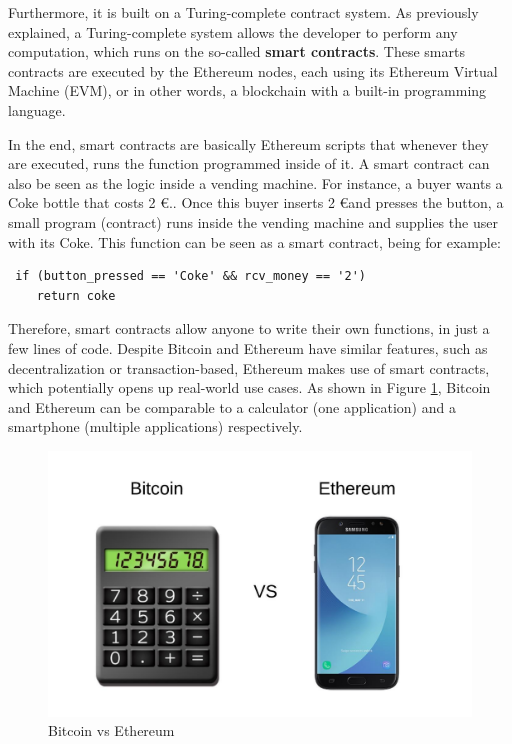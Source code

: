 Furthermore, it is built on a Turing-complete contract system. As previously explained, a Turing-complete system allows the developer to perform any computation, which runs on the so-called \textbf{smart contracts}. These smarts contracts are executed by the Ethereum nodes, each using its Ethereum Virtual Machine (EVM), or in other words, a blockchain with a built-in programming language.

In the end, smart contracts are basically Ethereum scripts that whenever they are executed, runs the function programmed inside of it. A smart contract can also be seen as the logic inside a vending machine. For instance, a buyer wants a Coke bottle that costs 2 \euro.. Once this buyer inserts 2 \euro and presses the button, a small program (contract) runs inside the vending machine and supplies the user with its Coke. This function can be seen as a smart contract, being for example:

\begin{lstlisting}
 if (button_pressed == 'Coke' && rcv_money == '2')
 	return coke
\end{lstlisting}

Therefore, smart contracts allow anyone to write their own functions, in just a few lines of code. Despite Bitcoin and Ethereum have similar features, such as decentralization or transaction-based, Ethereum makes use of smart contracts, which potentially opens up real-world use cases. As shown in Figure \ref{fig:BitcoinEthereum}, Bitcoin and Ethereum can be comparable to a calculator (one application) and a smartphone (multiple applications) respectively.


\begin{figure}[h]
  \centering
  	\includegraphics[scale=0.7]{gfx/bitcoinVSEthereum.jpeg}
  \caption{Bitcoin vs Ethereum}
  \label{fig:BitcoinEthereum}
\end{figure}

